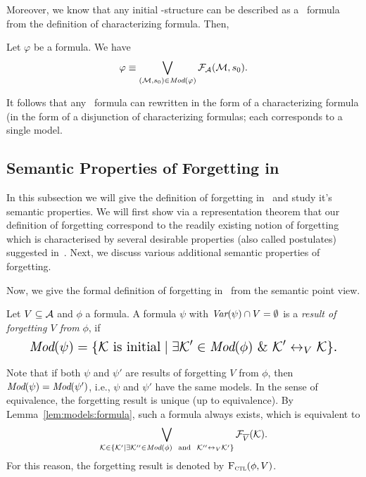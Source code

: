 \documentclass[letterpaper]{article} %
\begin{document}
Moreover, we know that any initial \MPK-structure can be described as a \CTL\ formula from the definition of characterizing formula. Then,
\begin{lemma}\label{lem:models:formula}
  Let $\varphi$ be a formula. We have
  \begin{equation}
    \varphi\equiv \bigvee_{({\cal M}, s_0)\in\textit{Mod}(\varphi)}{\cal F}_{\cal A}({\cal M}, s_0).
\end{equation}
\end{lemma}
It follows that any \CTL\ formula  can rewritten in the form of a  characterizing formula (in the form of a disjunction of characterizing formulas; each corresponds to a single model.







\subsection{Semantic Properties of Forgetting in \CTL}
In this subsection we will give the definition of forgetting in \CTL\ and study it's semantic properties.
 We will first show via a representation theorem that our definition of forgetting correspond to the readily existing notion of forgetting which is characterised by several desirable properties (also called postulates) suggested in~\cite{Yan:AIJ:2009}. Next, we discuss various additional semantic properties of forgetting.

Now, we give the formal definition of forgetting in \CTL\ from the semantic point view.
\begin{definition}[Forgetting]\label{def:V:forgetting}
  Let $V\subseteq\cal A$ and $\phi$ a formula.
A formula $\psi$ with $\textit{Var}(\psi)\cap V=\emptyset$
is a {\em result of forgetting $V$ from} $\phi$, if
\begin{equation}
\resizebox{.91\linewidth}{!}{$
\displaystyle
  \Mod(\psi)=\{{\cal K}\mbox{ is initial}\mid \exists {\cal K}'\in\Mod(\phi)\ \&\ {\cal K}'\lrto_V{\cal K}\}.
  $}
\end{equation}
\end{definition}
Note that if both $\psi$ and $\psi'$ are results of forgetting $V$ from $\phi$, then
$\textit{Mod}(\psi)=\textit{Mod}(\psi')$, i.e., $\psi$ and $\psi'$ have the same models. In the sense
of equivalence, the forgetting result is unique (up to equivalence).
By Lemma~\ref{lem:models:formula}, such a formula always exists, which
is equivalent to
\begin{equation*}
  \bigvee_{{\cal K}\in  \{{\cal K}'\mid \exists {\cal K}''\in\textit{Mod}(\phi)\ \text{ and }\ {\cal K}''\leftrightarrow_V{\cal K}'\}} {\cal F}_{\overline V}({\cal K}).
\end{equation*}
For this reason, the forgetting result is denoted by ${\textsc{F}_{\textsc{ctl}}}(\phi,V)$.
\end{document}
